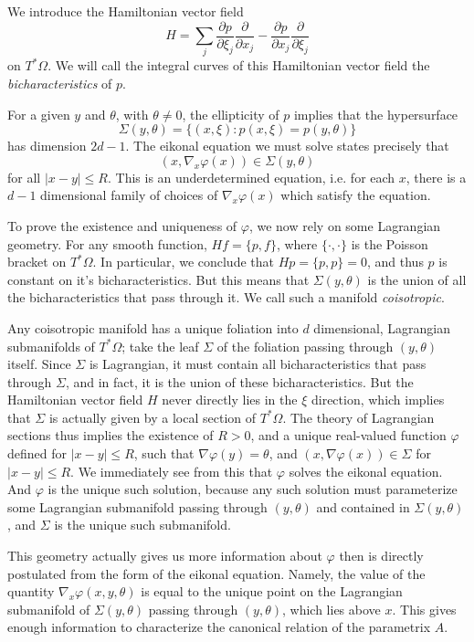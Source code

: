 \documentclass{article}
\theoremstyle{plain}
\theoremstyle{remark}
\theoremstyle{definition}
\begin{document}
We introduce the Hamiltonian vector field
%
\[ H = \sum_j \frac{\partial p}{\partial \xi_j} \frac{\partial}{\partial x_j} - \frac{\partial p}{\partial x_j} \frac{\partial}{\partial \xi_j} \]
%
on $T^* \Omega$. We will call the integral curves of this Hamiltonian vector field the \emph{bicharacteristics} of $p$.

For a given $y$ and $\theta$, with $\theta \neq 0$, the ellipticity of $p$ implies that the hypersurface
%
\[ \Sigma(y,\theta) = \{ (x,\xi) : p(x,\xi) = p(y,\theta) \} \]
%
has dimension $2d - 1$. The eikonal equation we must solve states precisely that
%
\[ (x, \nabla_x \varphi(x)) \in \Sigma(y,\theta) \]
%
for all $|x - y| \leq R$. This is an underdetermined equation, i.e. for each $x$, there is a $d-1$ dimensional family of choices of $\nabla_x \varphi(x)$ which satisfy the equation.

To prove the existence and uniqueness of $\varphi$, we now rely on some Lagrangian geometry.  For any smooth function, $Hf = \{ p, f \}$, where $\{ \cdot, \cdot \}$ is the Poisson bracket on $T^* \Omega$. In particular, we conclude that $Hp = \{ p, p \} = 0$, and thus $p$ is constant on it's bicharacteristics. But this means that $\Sigma(y,\theta)$ is the union of all the bicharacteristics that pass through it. We call such a manifold \emph{coisotropic}.

Any coisotropic manifold has a unique foliation into $d$ dimensional, Lagrangian submanifolds of $T^* \Omega$; take the leaf $\Sigma$ of the foliation passing through $(y,\theta)$ itself. Since $\Sigma$ is Lagrangian, it must contain all bicharacteristics that pass through $\Sigma$, and in fact, it is the union of these bicharacteristics. But the Hamiltonian vector field $H$ never directly lies in the $\xi$ direction, which implies that $\Sigma$ is actually given by a local section of $T^* \Omega$. The theory of Lagrangian sections thus implies the existence of $R > 0$, and a unique real-valued function $\varphi$ defined for $|x - y| \leq R$, such that $\nabla \varphi(y) = \theta$, and $(x,\nabla \varphi(x)) \in \Sigma$ for $|x - y| \leq R$. We immediately see from this that $\varphi$ solves the eikonal equation. And $\varphi$ is the unique such solution, because any such solution must parameterize some Lagrangian submanifold passing through $(y,\theta)$ and contained in $\Sigma(y,\theta)$, and $\Sigma$ is the unique such submanifold.

This geometry actually gives us more information about $\varphi$ then is directly postulated from the form of the eikonal equation. Namely, the value of the quantity $\nabla_x \varphi(x,y,\theta)$ is equal to the unique point on the Lagrangian submanifold of $\Sigma(y,\theta)$ passing through $(y,\theta)$, which lies above $x$. This gives enough information to characterize the canonical relation of the parametrix $A$.
\end{document}
